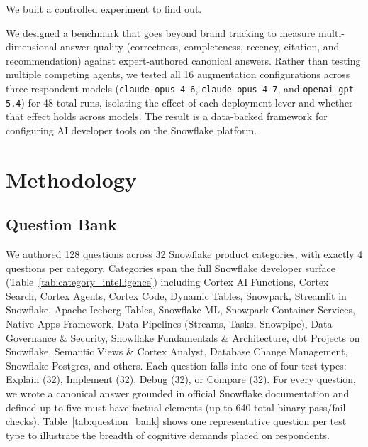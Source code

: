 \documentclass[10pt,letterpaper]{article}
\begin{document}
We built a controlled experiment to find out.

We designed a benchmark that goes beyond brand tracking to measure multi-dimensional answer quality (correctness, completeness, recency, citation, and recommendation) against expert-authored canonical answers. Rather than testing multiple competing agents, we tested all 16 augmentation configurations across three respondent models (\texttt{claude-opus-4-6}, \texttt{claude-opus-4-7}, and \texttt{openai-gpt-5.4}) for 48 total runs, isolating the effect of each deployment lever and whether that effect holds across models. The result is a data-backed framework for configuring AI developer tools on the Snowflake platform.

\section{Methodology}

\subsection{Question Bank}

We authored 128 questions across 32 Snowflake product categories, with exactly 4 questions per category. Categories span the full Snowflake developer surface (Table~\ref{tab:category_intelligence}) including Cortex AI Functions, Cortex Search, Cortex Agents, Cortex Code, Dynamic Tables, Snowpark, Streamlit in Snowflake, Apache Iceberg Tables, Snowflake ML, Snowpark Container Services, Native Apps Framework, Data Pipelines (Streams, Tasks, Snowpipe), Data Governance \& Security, Snowflake Fundamentals \& Architecture, dbt Projects on Snowflake, Semantic Views \& Cortex Analyst, Database Change Management, Snowflake Postgres, and others. Each question falls into one of four test types: Explain (32), Implement (32), Debug (32), or Compare (32). For every question, we wrote a canonical answer grounded in official Snowflake documentation and defined up to five must-have factual elements (up to 640 total binary pass/fail checks). Table~\ref{tab:question_bank} shows one representative question per test type to illustrate the breadth of cognitive demands placed on respondents.
\end{document}
